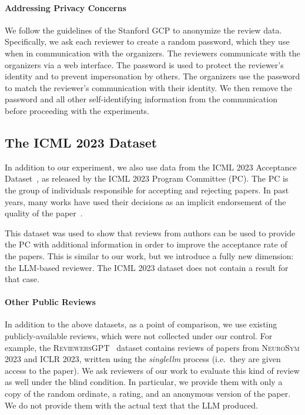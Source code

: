 \documentclass{article} %
\begin{document}
    \paragraph{Addressing Privacy Concerns}
    We follow the guidelines of the Stanford GCP to anonymize the review data. Specifically, we ask each reviewer to create a random password, which they use when in communication with the organizers. The reviewers communicate with the organizers via a web interface. The password is used to protect the reviewer's identity and to prevent impersonation by others. The organizers use the password to match the reviewer's communication with their identity. We then remove the password and all other self-identifying information from the communication before proceeding with the experiments.

\subsection{The \textsc{ICML 2023} Dataset}
In addition to our experiment, we also use data from the \textsc{ICML 2023} Acceptance Dataset~\citep{su2024analysis}, as released by the \textsc{ICML 2023} Program Committee (PC). The PC is the group of individuals responsible for accepting and rejecting papers. In past years, many works have used their decisions as an implicit endorsement of the quality of the paper~\citep{DBLP:journals/corr/abs-1903-11367, huang2023makes}. 

This dataset was used to show that reviews from authors can be used to provide the PC with additional information in order to improve the acceptance rate of the papers. This is similar to our work, but we introduce a fully new dimension: the LLM-based reviewer. The \textsc{ICML 2023} dataset does not contain a result for that case.
\paragraph{Other Public Reviews}
In addition to the above datasets, as a point of comparison, we use existing publicly-available reviews, which were not collected under our control. For example, the \textsc{ReviewersGPT}~\citep{liu2023reviewergpt} dataset contains reviews of papers from \textsc{NeuroSym 2023} and \textsc{ICLR 2023}, written using the \textit{singlellm} process (i.e.\ they are given access to the paper). We ask reviewers of our work to evaluate this kind of review as well under the blind condition. In particular, we provide them with only a copy of the random ordinate, a rating, and an anonymous version of the paper. We do not provide them with the actual text that the LLM produced. 
\end{document}
